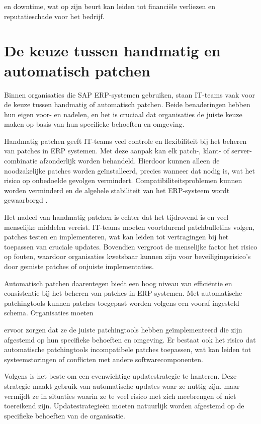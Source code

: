 en downtime, wat op zijn beurt kan leiden tot financiële verliezen en reputatieschade voor het bedrijf.


\section{De keuze tussen handmatig en automatisch patchen}

Binnen organisaties die SAP ERP-systemen gebruiken, staan IT-teams vaak voor de keuze tussen handmatig of automatisch patchen. Beide benaderingen hebben hun eigen voor- en nadelen, en het is cruciaal dat organisaties de juiste keuze maken op basis van hun specifieke behoeften en omgeving.

Handmatig patchen geeft IT-teams veel controle en flexibiliteit bij het beheren van patches in ERP systemen. Met deze aanpak kan elk patch-, klant- of server-combinatie afzonderlijk worden behandeld. Hierdoor kunnen alleen de noodzakelijke patches worden geïnstalleerd, precies wanneer dat nodig is, wat het risico op onbedoelde gevolgen vermindert. Compatibiliteitsproblemen kunnen worden verminderd en de algehele stabiliteit van het ERP-systeem wordt gewaarborgd \autocite{Hooper2018}.

Het nadeel van handmatig patchen is echter dat het tijdrovend is en veel menselijke middelen vereist. IT-teams moeten voortdurend patchbulletins volgen, patches testen en implementeren, wat kan leiden tot vertragingen bij het toepassen van cruciale updates. Bovendien vergroot de menselijke factor het risico op fouten, waardoor organisaties kwetsbaar kunnen zijn voor beveiligingsrisico’s door gemiste patches of onjuiste implementaties.

Automatisch patchen daarentegen biedt een hoog niveau van efficiëntie en consistentie bij het beheren van patches in ERP systemen. Met automatische patchingtools kunnen patches toegepast worden volgens een vooraf ingesteld schema. Organisaties moeten

ervoor zorgen dat ze de juiste patchingtools hebben geïmplementeerd die zijn afgestemd op hun specifieke behoeften en omgeving. Er bestaat ook het risico dat automatische patchingtools incompatibele patches toepassen, wat kan leiden tot systeemstoringen of conflicten met andere softwarecomponenten.

Volgens \textcite{Tozzi2017} is het beste om een evenwichtige updatestrategie te hanteren. Deze strategie maakt gebruik van automatische updates waar ze nuttig zijn, maar vermijdt ze in situaties waarin ze te veel risico met zich meebrengen of niet toereikend zijn. Updatestrategieën moeten natuurlijk worden afgestemd op de specifieke behoeften van de organisatie.

